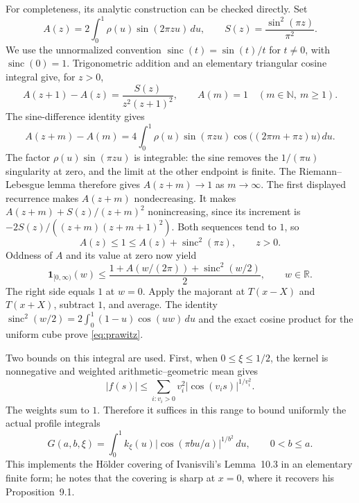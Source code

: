\documentclass[11pt]{article}
\newcommand{\R}{\mathbb R}
\begin{document}
For completeness, its analytic construction can be checked directly. Set
\[
 A(z)=2\int_0^1\rho(u)\sin(2\pi zu)\,du,
 \qquad S(z)=\frac{\sin^2(\pi z)}{\pi^2}.
\]
We use the unnormalized convention $\operatorname{sinc}(t)=\sin(t)/t$ for
$t\ne0$, with $\operatorname{sinc}(0)=1$.
Trigonometric addition and an elementary triangular cosine integral give,
for $z>0$,
\[
 A(z+1)-A(z)=\frac{S(z)}{z^2(z+1)^2},\qquad A(m)=1\quad(m\in\mathbb N,\ m\ge1).
\]
The sine-difference identity gives
\[
 A(z+m)-A(m)=4\int_0^1\rho(u)\sin(\pi zu)
                  \cos\bigl((2\pi m+\pi z)u\bigr)\,du.
\]
The factor $\rho(u)\sin(\pi zu)$ is integrable: the sine removes the
$1/(\pi u)$ singularity at zero, and the limit at the other endpoint is
finite. The Riemann--Lebesgue lemma therefore gives $A(z+m)\to1$ as
$m\to\infty$.
The first displayed recurrence makes $A(z+m)$ nondecreasing. It makes
$A(z+m)+S(z)/(z+m)^2$ nonincreasing, since its increment is
$-2S(z)/((z+m)(z+m+1)^2)$. Both sequences tend to $1$, so
\[
 A(z)\le1\le A(z)+\operatorname{sinc}^2(\pi z),\qquad z>0.
\]
Oddness of $A$ and its value at zero now yield
\[
 \boldsymbol1_{[0,\infty)}(w)
 \le \frac{1+A(w/(2\pi))+\operatorname{sinc}^2(w/2)}2,
 \qquad w\in\R.
\]
The right side equals $1$ at $w=0$. Apply the majorant at
$T(x-X)$ and $T(x+X)$, subtract $1$, and average. The identity
$\operatorname{sinc}^2(w/2)=2\int_0^1(1-u)\cos(uw)\,du$
and the exact cosine product for the uniform cube prove \eqref{eq:prawitz}.

Two bounds on this integral are used. First, when $0\le\xi\le1/2$, the kernel
is nonnegative and weighted arithmetic--geometric mean gives
\begin{equation}\label{eq:profile}
 |f(s)|\le\sum_{i:v_i>0}v_i^2|\cos(v_i s)|^{1/v_i^2}.
\end{equation}
The weights sum to $1$. Therefore it suffices in this range to bound uniformly
the actual profile integrals
\[
 G(a,b,\xi)=\int_0^1 k_\xi(u)|\cos(\pi bu/a)|^{1/b^2}\,du,
 \qquad 0<b\le a.
\]
This implements the Hölder covering of Ivanisvili's Lemma~10.3 \cite{I} in an
elementary finite form; he notes that the covering is sharp at $x=0$, where it
recovers his Proposition~9.1.
\end{document}
